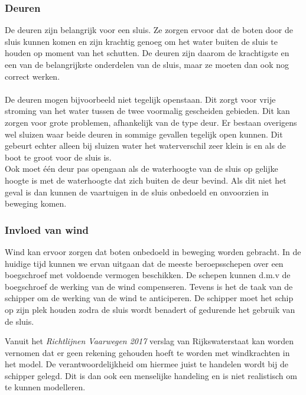 \documentclass{article}
\begin{document}
\subsubsection{Deuren}
De deuren zijn belangrijk voor een sluis. Ze zorgen ervoor dat de boten door de sluis kunnen komen en zijn krachtig genoeg om het water buiten de sluis te houden op moment van het schutten. De deuren zijn daarom de krachtigste en een van de belangrijkste onderdelen van de sluis, maar ze moeten dan ook nog correct werken.
\\\\
De deuren mogen bijvoorbeeld niet tegelijk openstaan. Dit zorgt voor vrije stroming van het water tussen de twee voormalig gescheiden gebieden. Dit kan zorgen voor grote problemen, afhankelijk van de type deur.  Er bestaan overigens wel sluizen waar beide deuren in sommige gevallen tegelijk open kunnen. Dit gebeurt echter alleen bij sluizen water het waterverschil zeer klein is en als de boot te groot voor de sluis is.\\
Ook moet één deur pas opengaan als de waterhoogte van de sluis op gelijke hoogte is met de waterhoogte dat zich buiten de deur bevind. Als dit niet het geval is dan kunnen de vaartuigen in de sluis onbedoeld en onvoorzien in beweging komen.


\subsubsection{Invloed van wind} %
Wind kan ervoor zorgen dat boten onbedoeld in beweging worden gebracht. In de huidige tijd kunnen we ervan uitgaan dat de meeste beroepsschepen over een boegschroef  met voldoende vermogen beschikken. De schepen kunnen d.m.v de boegschroef de werking van de wind compenseren. Tevens is het de taak van de schipper om de werking van de wind te anticiperen. De schipper moet het schip op zijn plek houden zodra de sluis wordt benadert of gedurende het gebruik van de sluis.

Vanuit het \textit{Richtlijnen Vaarwegen 2017} verslag van Rijkswaterstaat \cite{rijkswaterstaat2017} kan worden vernomen dat er geen rekening gehouden hoeft te worden met windkrachten in het model. De verantwoordelijkheid om hiermee juist te handelen wordt bij de schipper gelegd. Dit is dan ook een menselijke handeling en is niet realistisch om te kunnen modelleren.
\end{document}
